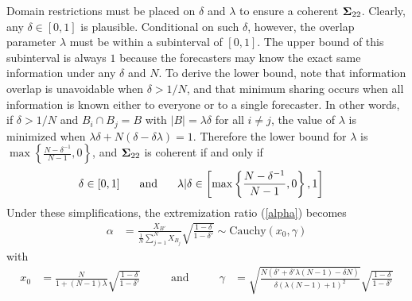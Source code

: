 \documentclass[12pt]{article}
\theoremstyle{definition}
\theoremstyle{definition}
\begin{document}
Domain restrictions must be placed on $\delta$ and $\lambda$ to ensure a coherent ${\bf\Sigma}_{22}$. Clearly, any $\delta \in [0,1]$ is plausible. Conditional on such $\delta$, however, the overlap parameter $\lambda$ must be within a subinterval of $[0,1]$. The upper bound of this subinterval is always $1$ because the 
forecasters may know the exact same information under any $\delta$ and $N$. To derive the lower bound, note that  
information overlap is unavoidable when $\delta > 1/N$, and that minimum
sharing occurs when all information is known either to everyone or
to a single forecaster.  In other words, if $\delta > 1/N$ and
$B_{i} \cap B_j = B$ with $|B| = \lambda \delta$ for all $i \neq j$,
the value of $\lambda$ is minimized when $\lambda\delta + N(\delta -
\delta\lambda) = 1$.  Therefore the lower bound for $\lambda$ is $\max
\left\{ \frac{N-\delta^{-1}}{N-1}, 0\right\}$, and ${\bf\Sigma}_{22}$ is
coherent if and only if
\begin{align}
\delta \in [0,1]  \hspace{0.2in} \mbox{ and } 
  \hspace{0.2in}   \lambda | \delta &\in \left[  
   \max \left\{ \frac{N-\delta^{-1}}{N-1}, 0\right\}, 1 \right] 
   \label{rhoDomain}
\end{align}
Under these simplifications, the extremization ratio (\ref{alpha})
becomes
\begin{align*}
\alpha &= \frac{X_{B'}}{\frac{1}{N}\sum_{j=1}^N X_{B_j}} \sqrt{\frac{1-\delta}{1-\delta'}} \sim \text{Cauchy}(x_0, \gamma)
\end{align*}
 with
\begin{align*}
x_0 &= \frac{N}{1+(N-1)\lambda}  \sqrt{\frac{1-\delta}{1-\delta'}} &&& \text{ and } &&& \gamma &=  \sqrt{\frac{N(\delta' + \delta' \lambda (N-1) - \delta N)}{\delta (\lambda (N-1) + 1)^2}}\sqrt{\frac{1-\delta}{1-\delta'}}
\end{align*}
\end{document}
